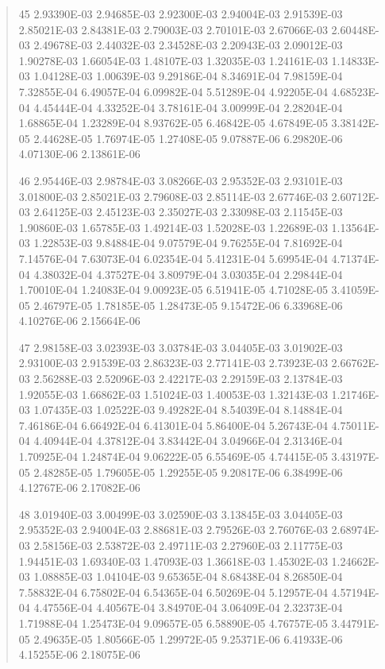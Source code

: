 \documentclass[letterpaper,10pt,english]{sphinxmanual}
\begin{document}
\begin{quote}
\begin{DUlineblock}{0em}
\item[] 45   2.93390E-03  2.94685E-03  2.92300E-03  2.94004E-03  2.91539E-03  2.85021E-03  2.84381E-03  2.79003E-03  2.70101E-03  2.67066E-03  2.60448E-03  2.49678E-03  2.44032E-03  2.34528E-03  2.20943E-03  2.09012E-03  1.90278E-03  1.66054E-03  1.48107E-03  1.32035E-03  1.24161E-03  1.14833E-03  1.04128E-03  1.00639E-03  9.29186E-04  8.34691E-04  7.98159E-04  7.32855E-04  6.49057E-04  6.09982E-04  5.51289E-04  4.92205E-04  4.68523E-04  4.45444E-04  4.33252E-04  3.78161E-04  3.00999E-04  2.28204E-04  1.68865E-04  1.23289E-04  8.93762E-05  6.46842E-05  4.67849E-05  3.38142E-05  2.44628E-05  1.76974E-05  1.27408E-05  9.07887E-06  6.29820E-06  4.07130E-06  2.13861E-06
\item[] 46   2.95446E-03  2.98784E-03  3.08266E-03  2.95352E-03  2.93101E-03  3.01800E-03  2.85021E-03  2.79608E-03  2.85114E-03  2.67746E-03  2.60712E-03  2.64125E-03  2.45123E-03  2.35027E-03  2.33098E-03  2.11545E-03  1.90860E-03  1.65785E-03  1.49214E-03  1.52028E-03  1.22689E-03  1.13564E-03  1.22853E-03  9.84884E-04  9.07579E-04  9.76255E-04  7.81692E-04  7.14576E-04  7.63073E-04  6.02354E-04  5.41231E-04  5.69954E-04  4.71374E-04  4.38032E-04  4.37527E-04  3.80979E-04  3.03035E-04  2.29844E-04  1.70010E-04  1.24083E-04  9.00923E-05  6.51941E-05  4.71028E-05  3.41059E-05  2.46797E-05  1.78185E-05  1.28473E-05  9.15472E-06  6.33968E-06  4.10276E-06  2.15664E-06
\item[] 47   2.98158E-03  3.02393E-03  3.03784E-03  3.04405E-03  3.01902E-03  2.93100E-03  2.91539E-03  2.86323E-03  2.77141E-03  2.73923E-03  2.66762E-03  2.56288E-03  2.52096E-03  2.42217E-03  2.29159E-03  2.13784E-03  1.92055E-03  1.66862E-03  1.51024E-03  1.40053E-03  1.32143E-03  1.21746E-03  1.07435E-03  1.02522E-03  9.49282E-04  8.54039E-04  8.14884E-04  7.46186E-04  6.66492E-04  6.41301E-04  5.86400E-04  5.26743E-04  4.75011E-04  4.40944E-04  4.37812E-04  3.83442E-04  3.04966E-04  2.31346E-04  1.70925E-04  1.24874E-04  9.06222E-05  6.55469E-05  4.74415E-05  3.43197E-05  2.48285E-05  1.79605E-05  1.29255E-05  9.20817E-06  6.38499E-06  4.12767E-06  2.17082E-06
\item[] 48   3.01940E-03  3.00499E-03  3.02590E-03  3.13845E-03  3.04405E-03  2.95352E-03  2.94004E-03  2.88681E-03  2.79526E-03  2.76076E-03  2.68974E-03  2.58156E-03  2.53872E-03  2.49711E-03  2.27960E-03  2.11775E-03  1.94451E-03  1.69340E-03  1.47093E-03  1.36618E-03  1.45302E-03  1.24662E-03  1.08885E-03  1.04104E-03  9.65365E-04  8.68438E-04  8.26850E-04  7.58832E-04  6.75802E-04  6.54365E-04  6.50269E-04  5.12957E-04  4.57194E-04  4.47556E-04  4.40567E-04  3.84970E-04  3.06409E-04  2.32373E-04  1.71988E-04  1.25473E-04  9.09657E-05  6.58890E-05  4.76757E-05  3.44791E-05  2.49635E-05  1.80566E-05  1.29972E-05  9.25371E-06  6.41933E-06  4.15255E-06  2.18075E-06

\end{DUlineblock}
\end{quote}
\end{document}
